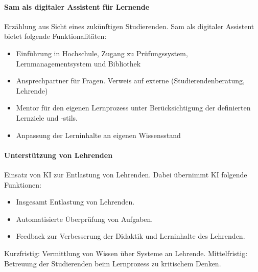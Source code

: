 \paragraph*{Sam als digitaler Assistent für Lernende}
Erzählung aus Sicht eines zukünftigen Studierenden. Sam als digitaler Assistent bietet folgende Funktionalitäten:
\begin{itemize}
    \item Einführung in Hochschule, Zugang zu Prüfungssystem, Lernmanagementsystem und Bibliothek
    \item Ansprechpartner für Fragen. Verweis auf externe (Studierendenberatung, Lehrende)
    \item Mentor für den eigenen Lernprozess unter Berücksichtigung der definierten Lernziele und -stils.
    \item Anpassung der Lerninhalte an eigenen Wissensstand
\end{itemize}

\paragraph*{Unterstützung von Lehrenden} Einsatz von KI zur Entlastung von Lehrenden. Dabei übernimmt KI folgende Funktionen:
\begin{itemize}
    \item Insgesamt Entlastung von Lehrenden.
    \item Automatisierte Überprüfung von Aufgaben.
    \item Feedback zur Verbesserung der Didaktik und Lerninhalte des Lehrenden.
\end{itemize}
Kurzfristig: Vermittlung von Wissen über Systeme an Lehrende. Mittelfristig: Betreuung der Studierenden beim Lernprozess zu kritischem Denken.